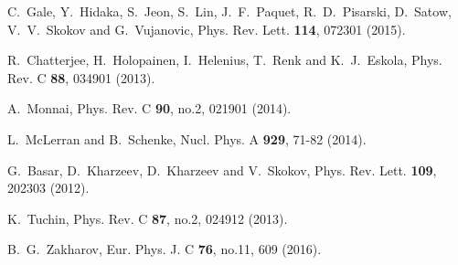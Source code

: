 \documentclass[aps,prc,twocolumn,floatfix,12pts,superscriptaddress]{revtex4}
\begin{document}
{{\begin{thebibliography}{99}
C.~Gale, Y.~Hidaka, S.~Jeon, S.~Lin, J.~F.~Paquet, R.~D.~Pisarski, D.~Satow, V.~V.~Skokov and G.~Vujanovic,
Phys. Rev. Lett. \textbf{114}, 072301 (2015).
	
	
R.~Chatterjee, H.~Holopainen, I.~Helenius, T.~Renk and K.~J.~Eskola,
Phys. Rev. C \textbf{88}, 034901 (2013).
	
A.~Monnai,
Phys. Rev. C \textbf{90}, no.2, 021901 (2014).
	
L.~McLerran and B.~Schenke,
Nucl. Phys. A \textbf{929}, 71-82 (2014).
	

G.~Basar, D.~Kharzeev, D.~Kharzeev and V.~Skokov,
Phys. Rev. Lett. \textbf{109}, 202303 (2012).
	
K.~Tuchin,
Phys. Rev. C \textbf{87}, no.2, 024912 (2013).
	
B.~G.~Zakharov,
Eur. Phys. J. C \textbf{76}, no.11, 609 (2016).
	


\end{thebibliography}}}
\end{document}
